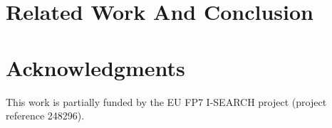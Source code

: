 \documentclass{acm_proc_article-sp}
\begin{document}
\section{Related Work And Conclusion}\label{sec:relatedwork}
\cite{W3C:Blog}


\section{Acknowledgments}\label{sec:acknowledgments}
This work is partially funded by the EU FP7 I-SEARCH project (project reference 248296).

%

%
%

\end{document}
